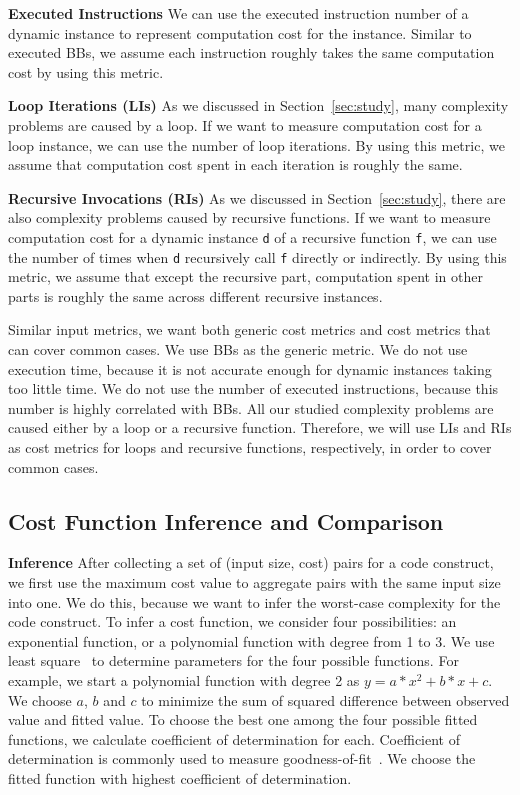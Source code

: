 \noindent\textbf{Executed Instructions}
We can use the executed instruction number of a dynamic 
instance to represent computation cost for the instance. 
Similar to executed BBs, we assume each instruction 
roughly takes the same computation cost by using this metric. 


\noindent\textbf{{Loop Iterations (LIs)}}
As we discussed in Section~\ref{sec:study},
many complexity problems are caused by a loop.
If we want to measure computation cost for a loop instance,
we can use the number of loop iterations.
By using this metric, we assume that computation 
cost spent in each iteration is roughly the same. 

\noindent\textbf{Recursive Invocations (RIs)}
As we discussed in Section~\ref{sec:study},
there are also complexity problems caused by recursive functions.
If we want to measure computation cost for a dynamic instance \texttt{d}
of a recursive function \texttt{f}, 
we can use the number of times when
\texttt{d} recursively call \texttt{f} directly or indirectly. 
By using this metric, 
we assume that except the recursive part, 
computation spent in other parts is roughly 
the same across different recursive instances. 

Similar input metrics,
we want both generic cost metrics and cost metrics that can cover common cases. 
We use BBs as the generic metric.
We do not use execution time, 
because it is not accurate enough for dynamic instances taking too little time.
We do not use the number of executed instructions, 
because this number is highly correlated with BBs.  
All our studied complexity problems are caused either by a loop or a recursive function. 
Therefore, we will use LIs and RIs as cost metrics for loops and recursive functions, 
respectively, in order to cover common cases. 


\subsection{Cost Function Inference and Comparison}

\noindent\textbf{Inference}
After collecting a set of (input size, cost) pairs for a code construct,
we first use the maximum cost value to aggregate pairs with the same input size into one.
We do this, because we want to infer the worst-case complexity for the code construct. 
To infer a cost function,
we consider four possibilities: 
an exponential function, or a polynomial function with degree from 1 to 3.
We use least square~\cite{least} to determine parameters for the four possible functions. 
For example, we start a polynomial function with degree 2 as $y=a*x^2 + b*x +c$.
We choose $a$, $b$ and $c$ to minimize the sum of squared difference between 
observed value and fitted value.  
To choose the best one among the four possible fitted functions, 
we calculate coefficient of determination for each. 
Coefficient of determination is commonly used to measure goodness-of-fit~\cite{codeter}.
We choose the fitted function with highest coefficient of determination. 


